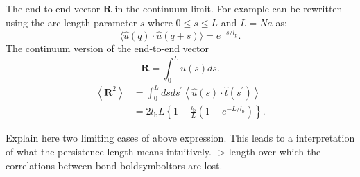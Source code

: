 The end-to-end vector $\boldsymbol{R}$ in the continuum limit. For example can be
rewritten using the arc-length parameter $s$ where $0 \leq s \leq L$ and $L = Na$ as:
\begin{equation}
    \label{hoi}
    \langle\widehat{u}(q) \cdot \widehat{u}(q+s)\rangle= e^{-s / l_{\mathrm{p}}}.
\end{equation}
The continuum version of the end-to-end vector
\begin{equation}
    \boldsymbol{R}=\int_{0}^{L} \widehat{u}(s) d s.
\end{equation}
\begin{equation}
\begin{aligned}
    \left\langle\boldsymbol{R}^{2}\right\rangle
    &= \int_{0}^{L} d s d s^{\prime}\left\langle\widehat{u}(s) \cdot
  \widehat{t}\left(s^{\prime}\right)\right\rangle \\
    &= 2 l_{\mathrm{b}} L\left\{1-\frac{l_{\mathrm{b}}}{L}\left(1-e^{-L /
l_{\mathrm{b}}}\right)\right\}.
\end{aligned}
\end{equation}

Explain here two limiting cases of above expression. This leads to a interpretation of
what the persistence length means intuitively. -> length over which the correlations
between bond boldsymboltors are lost.
